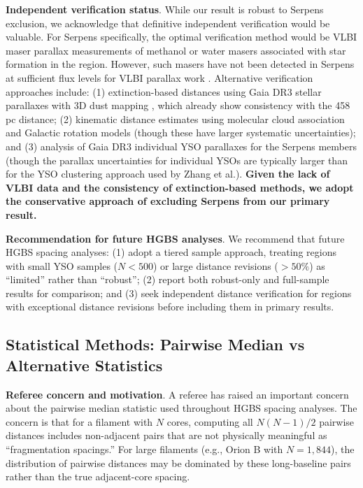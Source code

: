 \documentclass[twoside,twocolumn]{mnras}
\begin{document}
\textbf{Independent verification status}. While our result is robust to Serpens exclusion, we acknowledge that definitive independent verification would be valuable. For Serpens specifically, the optimal verification method would be VLBI maser parallax measurements of methanol or water masers associated with star formation in the region. However, such masers have not been detected in Serpens at sufficient flux levels for VLBI parallax work \citep[see][]{Reid2019}. Alternative verification approaches include: (1) extinction-based distances using Gaia DR3 stellar parallaxes with 3D dust mapping \citep{Yan2022,Green2024}, which already show consistency with the 458 pc distance; (2) kinematic distance estimates using molecular cloud association and Galactic rotation models (though these have larger systematic uncertainties); and (3) analysis of Gaia DR3 individual YSO parallaxes for the Serpens members (though the parallax uncertainties for individual YSOs are typically larger than for the YSO clustering approach used by Zhang et al.). \textbf{Given the lack of VLBI data and the consistency of extinction-based methods, we adopt the conservative approach of excluding Serpens from our primary result.}

\textbf{Recommendation for future HGBS analyses}. We recommend that future HGBS spacing analyses: (1) adopt a tiered sample approach, treating regions with small YSO samples ($N < 500$) or large distance revisions ($>50\%$) as ``limited'' rather than ``robust''; (2) report both robust-only and full-sample results for comparison; and (3) seek independent distance verification for regions with exceptional distance revisions before including them in primary results.

\subsection{Statistical Methods: Pairwise Median vs Alternative Statistics}
\label{sec:statistics}

\textbf{Referee concern and motivation}. A referee has raised an important concern about the pairwise median statistic used throughout HGBS spacing analyses. The concern is that for a filament with $N$ cores, computing all $N(N-1)/2$ pairwise distances includes non-adjacent pairs that are not physically meaningful as ``fragmentation spacings.'' For large filaments (e.g., Orion B with $N = 1,844$), the distribution of pairwise distances may be dominated by these long-baseline pairs rather than the true adjacent-core spacing.
\end{document}
